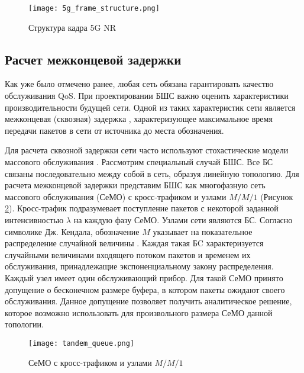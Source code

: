 \begin{figure}[h!]
  \centering
   \texttt{[image: 5g\_frame\_structure.png]}
\caption{Структура кадра 5G NR}
\label{fig:part1_5g_frame_structure}
\end{figure}


\subsection{Расчет межконцевой задержки}\label{part4_e2e_delay_section}

Как уже было отмечено ранее, любая сеть обязана гарантировать качество обслуживания QoS. При проектировании БШС важно оценить характеристики производительности будущей сети. Одной из таких характеристик сети является межконцевая (сквозная) задержка \cite{Vishnevsky2016_Methods_of_performance, Wang2017, Liu2016, Chen2019, Hosni2017, Capone2019, Abbas2017, Seliem2019, Malandra2018, Kalor2018, Larionov2019, Gao2016}, характеризующее максимальное время передачи пакетов в сети от источника до места обозначения.

Для расчета сквозной задержки сети часто используют стохастические модели массового обслуживания \cite{Vishnevsky2016_Methods_of_performance, Wang2017, Liu2016, Malandra2018, Larionov2019, Gao2016}. Рассмотрим специальный случай БШС. Все БС связаны последовательно между собой в сеть, образуя линейную топологию. Для расчета межконцевой задержки представим БШС как многофазную сеть массового обслуживания (СеМО) с кросс-трафиком и узлами $M/M/1$ (Рисунок \cref{fig:tandem_queue}). Кросс-трафик подразумевает поступление пакетов с некоторой заданной интенсивностью $\lambda$ на каждую фазу СеМО. Узлами сети являются БС. Согласно символике Дж. Кендала, обозначение $M$ указывает на показательное распределение случайной величины \cite{VishnevskyBook, Kleinrock1975}. Каждая такая БC характеризуется случайными величинами входящего потоком пакетов и временем их обслуживания, принадлежащие экспоненциальному закону распределения. Каждый узел имеет один обслуживающий прибор. Для такой СеМО принято допущение о бесконечном размере буфера, в котором пакеты ожидают своего обслуживания. Данное допущение позволяет получить аналитическое решение, которое возможно использовать для произвольного размера СеМО данной топологии.

\begin{figure}[h!]
  \centering
   \texttt{[image: tandem\_queue.png]}
\caption{СеМО с кросс-трафиком и узлами $M/M/1$}
\label{fig:tandem_queue}
\end{figure}

